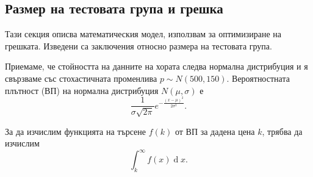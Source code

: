 \documentclass[11pt, a4paper]{article}
\theoremstyle{definition}
\begin{document}
		\subsection{Размер на тестовата група и грешка}
			Тази секция описва математическия модел, използвам за оптимизиране на грешката. Изведени са заключения относно размера на тестовата група.\par
			Приемаме, че стойността на данните на хората следва нормална дистрибуция и я свързваме със стохастичната променлива $p\sim N(500, 150)$. Вероятностната плътност (ВП) на нормална дистрибуция $N(\mu, \sigma)$ е $$\frac{1}{\sigma\sqrt{2\pi}}e^{-\frac{(x-\mu)^{2}}{2\sigma^{2}}}.$$\par\noindent
			За да изчислим функцията на търсене $f(k)$ от ВП за дадена цена $k$, трябва да изчислим
			$$\int_{k}^{\infty}f(x)\operatorname{d} x.$$
\end{document}
